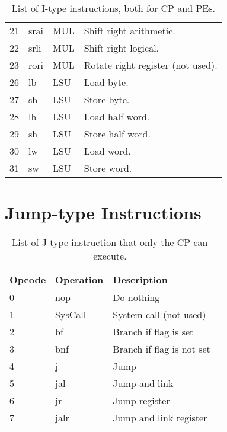 \begin{table}[h]
\begin{center}
\begin{tabular}{@{}p{}p{}p{}p{}@{}}
21 & srai & MUL	& Shift right arithmetic. \\ 
22 & srli & MUL	& Shift right logical. \\ 
23 & rori & MUL	& Rotate right register (not used). \\ 
26 & lb & LSU		& Load byte. \\ 
27 & sb & LSU		& Store byte. \\ 
28 & lh & LSU		& Load half word. \\ 
29 & sh & LSU		& Store half word. \\ 
30 & lw & LSU		& Load word. \\ 
31 & sw & LSU	& Store word. \\ 
\bottomrule
\end{tabular}
\end{center}
\caption{List of I-type instructions, both for CP and PEs.}
\label{table:i_ops}
\end{table}%

\clearpage

\section{Jump-type Instructions}
\begin{table}[h]
\begin{center}
\begin{tabular}{@{}p{}p{}p{}@{}}
\toprule
\textbf{Opcode} & \textbf{Operation} & \textbf{Description}\\ \hline
0 & nop & Do nothing \\ 
1 & SysCall & System call (not used) \\ 
2 & bf & Branch if flag is set \\ 
3 & bnf & Branch if flag is not set \\ 
4 & j & Jump \\ 
5 & jal & Jump and link \\ 
6 & jr & Jump register \\ 
7 & jalr & Jump and link register \\ 
\bottomrule
\end{tabular}
\end{center}
\caption{List of J-type instruction that only the CP can execute.}
\label{table:j_ops}
\end{table}%